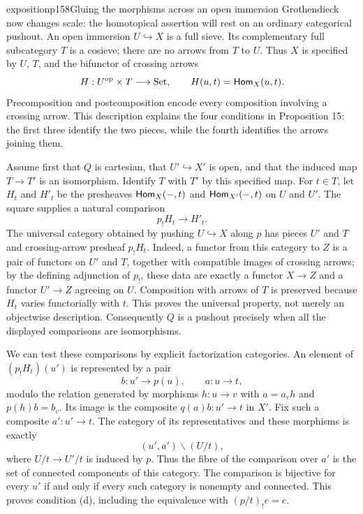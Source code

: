 \begin{dcomment}{exposition}{p158}{Gluing the morphisms across an open immersion}
Grothendieck now changes scale: the homotopical assertion will rest on an ordinary categorical pushout. An open immersion $U\hookrightarrow X$ is a full sieve. Its complementary full subcategory $T$ is a cosieve; there are no arrows from $T$ to $U$. Thus $X$ is specified by $U$, $T$, and the bifunctor of crossing arrows
\[
       H:U^{\mathrm{op}}\times T\longrightarrow\mathrm{Set},
       \qquad H(u,t)=\mathsf{Hom}_X(u,t).
\]
Precomposition and postcomposition encode every composition involving a crossing arrow. This description explains the four conditions in Proposition 15: the first three identify the two pieces, while the fourth identifies the arrows joining them.

Assume first that $Q$ is cartesian, that $U'\hookrightarrow X'$ is open, and that the induced map $T\to T'$ is an isomorphism. Identify $T$ with $T'$ by this specified map. For $t\in T$, let $H_t$ and $H'_t$ be the presheaves $\mathsf{Hom}_X(-,t)$ and $\mathsf{Hom}_{X'}(-,t)$ on $U$ and $U'$. The square supplies a natural comparison
\[
                  p_!H_t\longrightarrow H'_t.
\]
The universal category obtained by pushing $U\hookrightarrow X$ along $p$ has pieces $U'$ and $T$ and crossing-arrow presheaf $p_!H_t$. Indeed, a functor from this category to $Z$ is a pair of functors on $U'$ and $T$, together with compatible images of crossing arrows; by the defining adjunction of $p_!$, these data are exactly a functor $X\to Z$ and a functor $U'\to Z$ agreeing on $U$. Composition with arrows of $T$ is preserved because $H_t$ varies functorially with $t$. This proves the universal property, not merely an objectwise description. Consequently $Q$ is a pushout precisely when all the displayed comparisons are isomorphisms.

We can test these comparisons by explicit factorization categories. An element of $(p_!H_t)(u')$ is represented by a pair
\[
       b:u'\longrightarrow p(u),\qquad a:u\longrightarrow t,
\]
modulo the relation generated by morphisms $h:u\to v$ with $a=a_vh$ and $p(h)b=b_v$. Its image is the composite $q(a)b:u'\to t$ in $X'$. Fix such a composite $a':u'\to t$. The category of its representatives and these morphisms is exactly
\[
        (u',a')\backslash(U/t),
\]
where $U/t\to U'/t$ is induced by $p$. Thus the fibre of the comparison over $a'$ is the set of connected components of this category. The comparison is bijective for every $u'$ if and only if every such category is nonempty and connected. This proves condition (d), including the equivalence with $(p/t)_!e=e$.


\end{dcomment}
